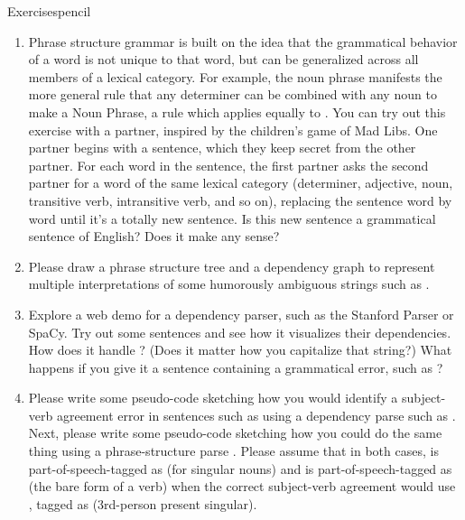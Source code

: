 \begin{tblsfilledsymbol}{Exercises}{pencil}


\begin{enumerate}

\item Phrase structure grammar is built on the idea that the grammatical behavior of a word is not unique to that word, but can be generalized across all members of a lexical category.  For example, the noun phrase  manifests the more general rule that any determiner can be combined with any noun to make a Noun Phrase, a rule which applies equally to .  You can try out this exercise with a partner, inspired by the children's game of Mad Libs.  One partner begins with a sentence, which they keep secret from the other partner.  For each word in the sentence, the first partner asks the second partner for a word of the same lexical category (determiner, adjective, noun, transitive verb, intransitive verb, and so on), replacing the sentence word by word until it's a totally new sentence.  Is this new sentence a grammatical sentence of English?  Does it make any sense?

\item  Please draw a phrase structure tree and a dependency graph to represent multiple interpretations of some  humorously ambiguous strings such as .


\item  Explore a web demo for a dependency parser, such as the Stanford Parser or SpaCy.  Try out some sentences and see how it visualizes their dependencies.  How does it handle ?   (Does it matter how you capitalize that string?) What happens if you give it a sentence containing a grammatical error, such as ?

\item Please write some pseudo-code sketching how you would identify a subject-verb agreement error in sentences such as  using a dependency parse such as .  Next, please write some pseudo-code sketching how you could do the same thing using a phrase-structure parse .  Please assume that in both cases,  is part-of-speech-tagged as  (for singular nouns) and  is part-of-speech-tagged as  (the bare form of a verb) when the correct subject-verb agreement would use , tagged as  (3rd-person present singular).


\end{enumerate}
\end{tblsfilledsymbol}
